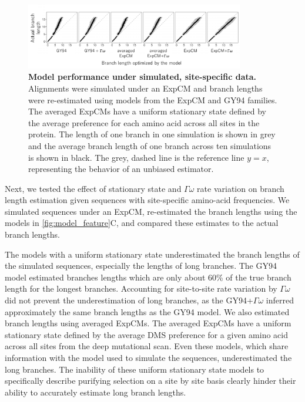 \documentclass[11pt]{article}
\begin{document}
\begin{figure}[H]
\centerline{\includegraphics[width=0.85\textwidth]{figures/simulations}}
\caption{\label{fig:simulations}
\textbf{Model performance under simulated, site-specific data.} 
Alignments were simulated under an ExpCM and branch lengths were re-estimated using models from the ExpCM and GY94 families. 
The averaged ExpCMs have a uniform stationary state defined by the average preference for each amino acid across all sites in the protein. 
The length of one branch in one simulation is shown in grey and the average branch length of one branch across ten simulations is shown in black. 
The grey, dashed line is the reference line $y=x$, representing the behavior of an unbiased estimator. 
}
\end{figure}

Next, we tested the effect of stationary state and $\Gamma\omega$ rate variation on branch length estimation given sequences with site-specific amino-acid frequencies. 
We simulated sequences under an ExpCM, re-estimated the branch lengths using the models in \ref{fig:model_feature}C, and compared these estimates to the actual branch lengths.

The models with a uniform stationary state underestimated the branch lengths of the simulated sequences, especially the lengths of long branches. 
The GY94 model estimated branches lengths which are only about 60\% of the true branch length for the longest branches. 
Accounting for site-to-site rate variation by $\Gamma\omega$ did not prevent the underestimation of long branches, as the GY94+$\Gamma\omega$ inferred approximately the same branch lengths as the GY94 model.
We also estimated branch lengths using averaged ExpCMs.
The averaged ExpCMs have a uniform stationary state defined by the average DMS preference for a given amino acid across all sites from the deep mutational scan. 
Even these models, which share information with the model used to simulate the sequences, underestimated the long branches. 
The inability of these uniform stationary state models to specifically describe purifying selection on a site by site basis clearly hinder their ability to accurately estimate long branch lengths. 
\end{document}
